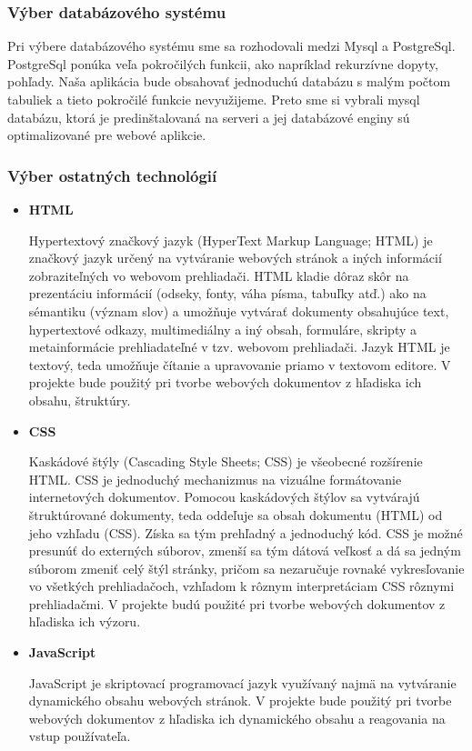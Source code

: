 \documentclass[12pt,a4paper]{article}
\begin{document}
\subsubsection{Výber databázového systému}
Pri výbere databázového systému sme sa rozhodovali medzi Mysql a PostgreSql. PostgreSql ponúka veľa pokročilých funkcii, ako napríklad rekurzívne dopyty, pohľady. Naša aplikácia bude obsahovať jednoduchú databázu s malým počtom tabuliek a tieto pokročilé funkcie nevyužijeme. Preto sme si vybrali mysql databázu, ktorá je predinštalovaná na serveri a jej databázové enginy sú optimalizované pre webové aplikcie.

\subsubsection{Výber ostatných technológií}
\begin{itemize}
	\item{\bf HTML} \par
	Hypertextový značkový jazyk (HyperText Markup Language; HTML) je značkový jazyk určený na vytváranie webových stránok a iných informácií zobraziteľných vo webovom prehliadači. HTML kladie dôraz skôr na prezentáciu informácií (odseky, fonty, váha písma, tabuľky atď.) ako na sémantiku (význam slov) a umožňuje vytvárať dokumenty obsahujúce text, hypertextové odkazy, multimediálny a iný obsah, formuláre, skripty a metainformácie prehliadateľné v tzv. webovom prehliadači. Jazyk HTML je textový, teda umožňuje čítanie a upravovanie priamo v textovom editore. V projekte bude použitý pri tvorbe webových dokumentov z hľadiska ich obsahu, štruktúry.
	\item{\bf CSS} \par
	Kaskádové štýly (Cascading Style Sheets; CSS) je všeobecné rozšírenie HTML. CSS je jednoduchý mechanizmus na vizuálne formátovanie internetových dokumentov. Pomocou kaskádových štýlov sa vytvárajú štruktúrované dokumenty, teda oddeľuje sa obsah dokumentu (HTML) od jeho vzhľadu (CSS). Získa sa tým prehľadný a jednoduchý kód. CSS je možné presunúť do externých súborov, zmenší sa tým dátová veľkosť a dá sa jedným súborom zmeniť celý štýl stránky, pričom sa nezaručuje rovnaké vykresľovanie vo všetkých prehliadačoch, vzhľadom k rôznym interpretáciam CSS rôznymi prehliadačmi. V projekte budú použité pri tvorbe webových dokumentov z hľadiska ich výzoru.
	\item{\bf JavaScript} \par
	JavaScript je skriptovací programovací jazyk využívaný najmä na vytváranie dynamického obsahu webových stránok. V projekte bude použitý pri tvorbe webových dokumentov z hľadiska ich dynamického obsahu a reagovania na vstup používateľa.

\end{itemize}
\end{document}
